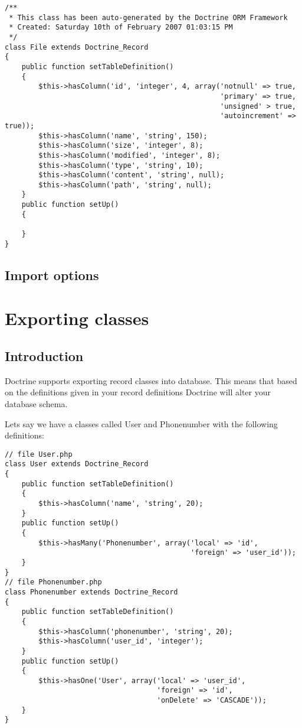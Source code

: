 \documentclass[11pt,a4paper]{report}
\begin{document}
\begin{verbatim}
/**
 * This class has been auto-generated by the Doctrine ORM Framework
 * Created: Saturday 10th of February 2007 01:03:15 PM
 */
class File extends Doctrine_Record
{
    public function setTableDefinition()
    {
        $this->hasColumn('id', 'integer', 4, array('notnull' => true,
                                                   'primary' => true,
                                                   'unsigned' > true,
                                                   'autoincrement' => true));
        $this->hasColumn('name', 'string', 150);
        $this->hasColumn('size', 'integer', 8);
        $this->hasColumn('modified', 'integer', 8);
        $this->hasColumn('type', 'string', 10);
        $this->hasColumn('content', 'string', null);
        $this->hasColumn('path', 'string', null);
    }
    public function setUp()
    {

    }
}
\end{verbatim}

\subsection{Import options}
\section{Exporting classes}
\subsection{Introduction}
Doctrine supports exporting record classes into database. This means that based on the definitions given in your record definitions Doctrine will alter your database schema.

Lets say we have a classes called User and Phonenumber with the following definitions:

\begin{verbatim}
// file User.php
class User extends Doctrine_Record
{
    public function setTableDefinition()
    {
        $this->hasColumn('name', 'string', 20);
    }
    public function setUp()
    {
        $this->hasMany('Phonenumber', array('local' => 'id',
                                            'foreign' => 'user_id'));
    }
}
// file Phonenumber.php
class Phonenumber extends Doctrine_Record
{
    public function setTableDefinition()
    {
        $this->hasColumn('phonenumber', 'string', 20);
        $this->hasColumn('user_id', 'integer');
    }
    public function setUp()
    {
        $this->hasOne('User', array('local' => 'user_id',
                                    'foreign' => 'id',
                                    'onDelete' => 'CASCADE'));
    }
}
\end{verbatim}
\end{document}
